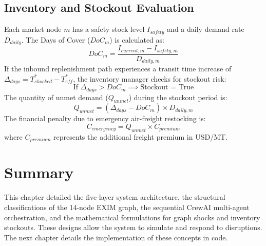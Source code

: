 \subsection{Inventory and Stockout Evaluation}
Each market node $m$ has a safety stock level $I_{safety}$ and a daily demand rate $D_{daily}$. The Days of Cover ($DoC_m$) is calculated as:
\begin{equation}
    DoC_m = \frac{I_{current, m} - I_{safety, m}}{D_{daily, m}}
\end{equation}
If the inbound replenishment path experiences a transit time increase of $\Delta_{days} = T_{shocked}^* - T_{eff}^*$, the inventory manager checks for stockout risk:
\begin{equation}
    \text{If } \Delta_{days} > DoC_m \implies \text{Stockout = True}
\end{equation}
The quantity of unmet demand ($Q_{unmet}$) during the stockout period is:
\begin{equation}
    Q_{unmet} = (\Delta_{days} - DoC_m) \times D_{daily, m}
\end{equation}
The financial penalty due to emergency air-freight restocking is:
\begin{equation}
    C_{emergency} = Q_{unmet} \times C_{premium}
\end{equation}
where $C_{premium}$ represents the additional freight premium in USD/MT.

\section{Summary}
This chapter detailed the five-layer system architecture, the structural classifications of the 14-node EXIM graph, the sequential CrewAI multi-agent orchestration, and the mathematical formulations for graph shocks and inventory stockouts. These designs allow the system to simulate and respond to disruptions. The next chapter details the implementation of these concepts in code.